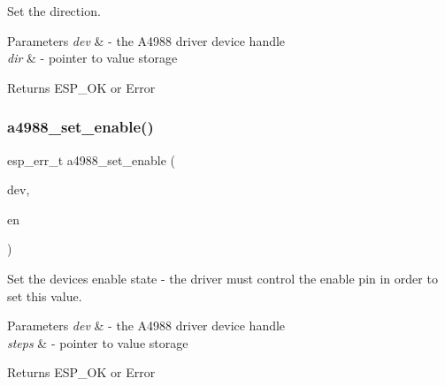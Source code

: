 Set the direction. 


\begin{DoxyParams}{Parameters}
{\em dev} & -\/ the A4988 driver device handle \\
\hline
{\em dir} & -\/ pointer to value storage \\
\hline
\end{DoxyParams}
\begin{DoxyReturn}{Returns}
E\+S\+P\+\_\+\+OK or Error 
\end{DoxyReturn}
\mbox{\label{group__A4988__Driver__functions_gabfef3cf1f7be7216983e91510c43dd92}} 
\subsubsection{\texorpdfstring{a4988\+\_\+set\+\_\+enable()}{a4988\_set\_enable()}}
{\footnotesize\ttfamily esp\+\_\+err\+\_\+t a4988\+\_\+set\+\_\+enable (\begin{DoxyParamCaption}\item[{\hyperlink{group__A4988__definitions_ga16590a9dd79ad8fcf4c317be2659b6c5}{A4988\+\_\+\+D\+EV}}]{dev,  }\item[{bool $\ast$}]{en }\end{DoxyParamCaption})}



Set the device\textquotesingle{}s enable state -\/ the driver must control the enable pin in order to set this value. 


\begin{DoxyParams}{Parameters}
{\em dev} & -\/ the A4988 driver device handle \\
\hline
{\em steps} & -\/ pointer to value storage \\
\hline
\end{DoxyParams}
\begin{DoxyReturn}{Returns}
E\+S\+P\+\_\+\+OK or Error 
\end{DoxyReturn}
\mbox{\label{group__A4988__Driver__functions_ga54510570aa6ac5475af005f81d93c5b0}} 
